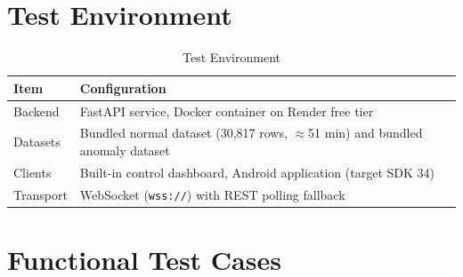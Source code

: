 \documentclass[10pt,a4paper]{report}
\begin{document}
\section{Test Environment}

\begin{table}[H]
\centering
\renewcommand{\arraystretch}{1.3}
\begin{tabular}{|p{4.5cm}|p{8.5cm}|}
\hline
\textbf{Item} & \textbf{Configuration} \\
\hline
Backend & FastAPI service, Docker container on Render free tier \\
\hline
Datasets & Bundled normal dataset (30{,}817 rows, $\approx$51 min) and bundled anomaly dataset \\
\hline
Clients & Built-in control dashboard, Android application (target SDK 34) \\
\hline
Transport & WebSocket (\texttt{wss://}) with REST polling fallback \\
\hline
\end{tabular}
\caption{Test Environment}
\end{table}

\section{Functional Test Cases}
\end{document}
